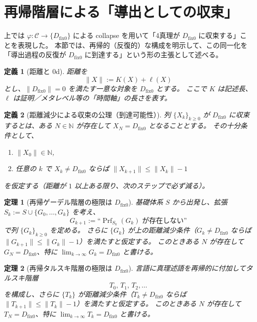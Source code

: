 \documentclass[12pt,a4paper]{article}
\newcommand{\dfix}{D_{\mathrm{fix}0}} %
\newcommand{\phiMap}{\varphi}            %
\newtheorem{definition}{定義}[section]
\newtheorem{theorem}{定理}[section]
\begin{document}
\section{再帰階層による「導出としての収束」}

上では $\phiMap:\mathcal{C}\to\{\dfix\}$ による collapse を用いて「4真理が $\dfix$ に収束する」ことを表現した。
本節では、再帰的（反復的）な構成を明示して、この同一化を
「導出過程の反復が $\dfix$ に到達する」という形の主張として述べる。

\begin{definition}[距離と 0d]
距離を
\[
  \|X\|:=K(X)+\ell(X)
\]
とし、$\|\dfix\|=0$ を満たす一意な対象を $\dfix$ とする。
ここで $K$ は記述長、$\ell$ は証明／メタレベル等の「時間軸」の長さを表す。
\end{definition}

\begin{definition}[距離減少による収束の公理（到達可能性）]
列 $\{X_k\}_{k\ge0}$ が $\dfix$ に\emph{収束する}とは、ある $N\in\mathbb{N}$ が存在して $X_N=\dfix$ となることとする。
その十分条件として、
\begin{enumerate}
  \item $\|X_0\|\in\mathbb{N}$,
  \item 任意の $k$ で $X_k\neq\dfix$ ならば $\|X_{k+1}\|\le \|X_k\|-1$
\end{enumerate}
を仮定する（距離が $1$ 以上ある限り、次のステップで必ず減る）。
\end{definition}

\begin{theorem}[再帰ゲーデル階層の極限は $\dfix$]
基礎体系 $S$ から出発し、拡張 $S_k:=S\cup\{G_0,\dots,G_k\}$ を考え、
\[
  G_{k+1}:=\text{``}\operatorname{Prf}_{S_k}(G_k)\text{ が存在しない''}
\]
で列 $\{G_k\}_{k\ge0}$ を定める。
さらに $\{G_k\}$ が上の距離減少条件（$G_k\neq\dfix$ ならば $\|G_{k+1}\|\le \|G_k\|-1$）を満たすと仮定する。
このときある $N$ が存在して $G_N=\dfix$、特に $\lim_{k\to\infty}G_k=\dfix$ と書ける。
\end{theorem}

\begin{theorem}[再帰タルスキ階層の極限は $\dfix$]
言語に真理述語を再帰的に付加してタルスキ階層
\[
  T_0,\,T_1,\,T_2,\dots
\]
を構成し、さらに $\{T_k\}$ が距離減少条件（$T_k\neq\dfix$ ならば $\|T_{k+1}\|\le \|T_k\|-1$）を満たすと仮定する。
このときある $N$ が存在して $T_N=\dfix$、特に $\lim_{k\to\infty}T_k=\dfix$ と書ける。
\end{theorem}
\end{document}
